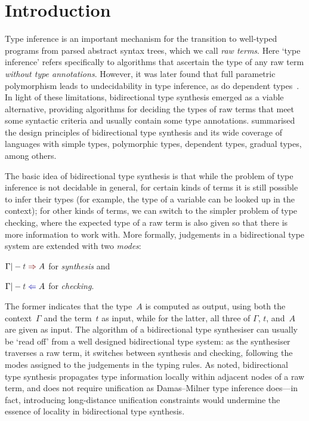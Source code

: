 
\section{Introduction}\label{sec:intro}

Type inference is an important mechanism for the transition to well-typed programs from parsed abstract syntax trees, which we call \emph{raw terms}.
Here `type inference' refers specifically to algorithms that ascertain the type of any raw term \emph{without type annotations}.
However, it was later found that full parametric polymorphism leads to undecidability in type inference, as do dependent types~\citep{Wells1999,Dowek1993}.
In light of these limitations, bidirectional type synthesis emerged as a viable alternative, providing algorithms for deciding the types of raw terms that meet some syntactic criteria%
and usually contain some type annotations.
\citet{Dunfield2021} summarised the design principles of bidirectional type synthesis and its wide coverage of languages with simple types, polymorphic types, dependent types, gradual types, among others.

The basic idea of bidirectional type synthesis is that while the problem of type inference is not decidable in general, for certain kinds of terms it is still possible to infer their types (for example, the type of a variable can be looked up in the context); for other kinds of terms, we can switch to the simpler problem of type checking, where the expected type of a raw term is also given so that there is more information to work with.
More formally, judgements in a bidirectional type system are extended with two \emph{modes}:
\begin{enumerate*}
  \item $\Gamma |- \isTerm{t} \syn A$ for \emph{synthesis} and 
  \item $\Gamma |- \isTerm{t} \chk A$ for \emph{checking}.
\end{enumerate*}
The former indicates that the type~$A$ is computed as output, using both the context~$\Gamma$ and the term~$t$ as input, while for the latter, all three of $\Gamma$, $t$, and~$A$ are given as input.
The algorithm of a bidirectional type synthesiser can usually be `read off' from a well designed bidirectional type system: as the synthesiser traverses a raw term, it switches between synthesis and checking, following the modes assigned to the judgements in the typing rules.
As \citet{Pierce2000} noted, bidirectional type synthesis propagates type information locally within adjacent nodes of a raw term, and does not require unification as Damas--Milner type inference does---in fact, introducing long-distance unification constraints would undermine the essence of locality in bidirectional type synthesis.

